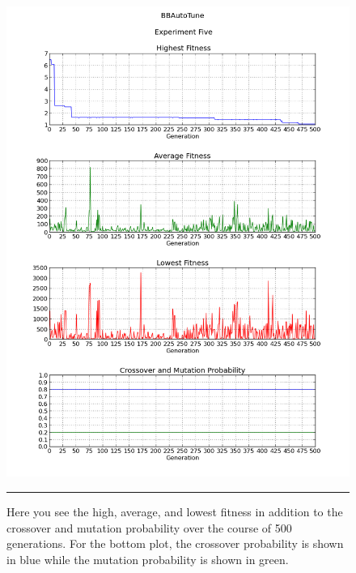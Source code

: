 \begin{figure}[htbp]
\centering
\includegraphics[width=5in]{../Figures/Chapter4/exp5_halcm.png}
\rule{35em}{0.5pt}
\caption[Experiment Five GA Metrics]{Here you see the high, average, and lowest fitness in addition to the crossover and mutation probability over the course of 500 generations. For the bottom plot, the crossover probability is shown in blue while the mutation probability is shown in green.}
\label{fig:exp5_halcm}
\end{figure}

